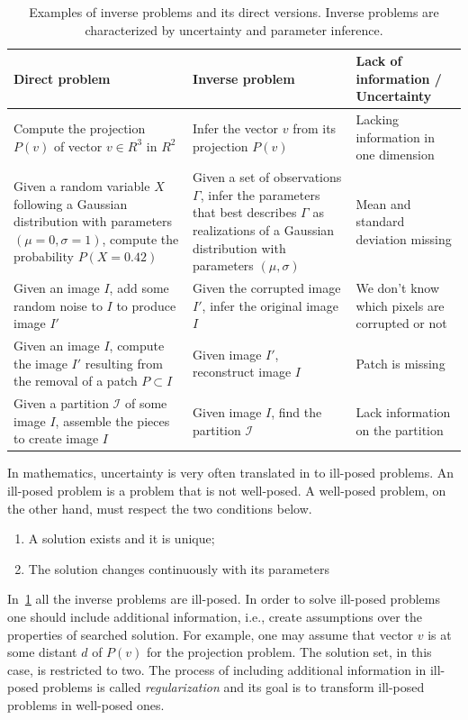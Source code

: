 \begin{table}
\footnotesize
\begin{tabular}{|m{6cm}|m{5cm}|m{5cm}|}
\hline
Direct problem & Inverse problem & Lack of information / Uncertainty \\
\hline
Compute the projection $P(v)$ of vector $v \in R^3$ in $R^2$ & Infer the vector $v$ from its projection $P(v)$ & Lacking information in one dimension\\
\hline
Given a random variable $X$ following a Gaussian distribution with parameters $(\mu=0,\sigma=1)$, compute the probability $P(X=0.42)$ & Given a set of observations $\Gamma$, infer the parameters that best describes $\Gamma$ as realizations of a Gaussian distribution with parameters $(\mu,\sigma)$ &  Mean and standard deviation missing\\
\hline
Given an image $I$, add some random noise to $I$ to produce image $I'$ & Given the corrupted image $I'$, infer the original image $I$ & We don't know which pixels are corrupted or not \\
\hline
Given an image $I$, compute the image $I'$ resulting from the removal of a patch $P \subset  I$ & Given image $I'$, reconstruct image $I$ & Patch is missing\\
\hline
Given a partition $\mathcal{I}$ of some image $I$, assemble the pieces to create image $I$ & Given image $I$, find the partition $\mathcal{I}$ & Lack information on the partition\\
\hline
\end{tabular}
\caption{Examples of inverse problems and its direct versions. Inverse problems are characterized by uncertainty and parameter inference. }
\label{ch1:tab:inverse-problems-list}
\end{table}

In mathematics, uncertainty is very often translated in to ill-posed problems. An ill-posed problem is a problem that is not well-posed. A well-posed problem, on the other hand, must respect the two conditions below.

\begin{enumerate}
\item{A solution exists and it is unique;}
\item{The solution changes continuously with its parameters}
\end{enumerate}



In~\cref{ch1:tab:inverse-problems-list} all the inverse problems are ill-posed. In order to solve ill-posed problems one should include additional information, i.e., create assumptions over the properties of searched solution. For example, one may assume that vector $v$ is at some distant $d$ of $P(v)$ for the projection problem. The solution set, in this case, is restricted to two. The process of including additional information in ill-posed problems is called \emph{regularization} and its goal is to transform ill-posed problems in well-posed ones.


